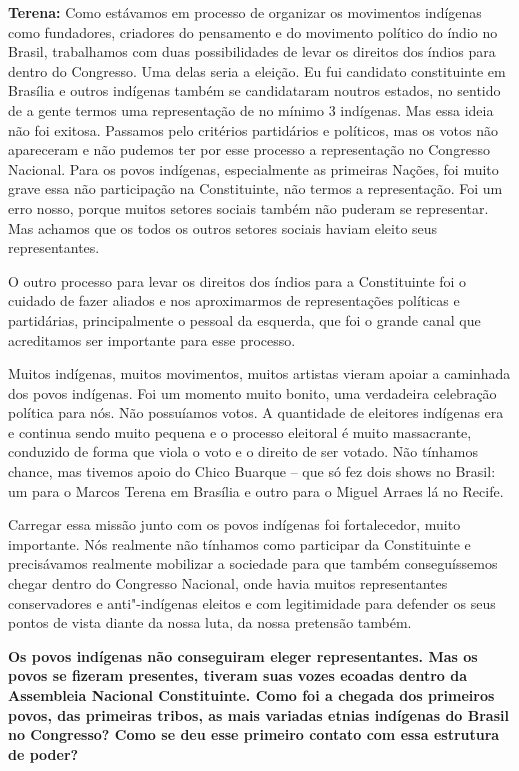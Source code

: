 \textbf{Terena:} Como estávamos em processo de organizar os movimentos
indígenas como fundadores, criadores do pensamento e do movimento
político do índio no Brasil, trabalhamos com duas possibilidades de
levar os direitos dos índios para dentro do Congresso. Uma delas seria a
eleição. Eu fui candidato constituinte em Brasília e outros indígenas
também se candidataram noutros estados, no sentido de a gente termos uma
representação de no mínimo 3 indígenas. Mas essa ideia não foi exitosa.
Passamos pelo critérios partidários e políticos, mas os votos não
apareceram e não pudemos ter por esse processo a representação no
Congresso Nacional. Para os povos indígenas, especialmente as primeiras
Nações, foi muito grave essa não participação na Constituinte, não
termos a representação. Foi um erro nosso, porque muitos setores sociais
também não puderam se representar. Mas achamos que os todos os outros
setores sociais haviam eleito seus representantes.

O outro processo para levar os direitos dos índios para a Constituinte
foi o cuidado de fazer aliados e nos aproximarmos de representações
políticas e partidárias, principalmente o pessoal da esquerda, que foi o
grande canal que acreditamos ser importante para esse processo.

Muitos indígenas, muitos movimentos, muitos artistas vieram apoiar a
caminhada dos povos indígenas. Foi um momento muito bonito, uma
verdadeira celebração política para nós. Não possuíamos votos. A
quantidade de eleitores indígenas era e continua sendo muito pequena e o
processo eleitoral é muito massacrante, conduzido de forma que viola o
voto e o direito de ser votado. Não tínhamos chance, mas tivemos apoio
do Chico Buarque -- que só fez dois shows no Brasil: um para o Marcos
Terena em Brasília e outro para o Miguel Arraes lá no Recife.

Carregar essa missão junto com os povos indígenas foi fortalecedor,
muito importante. Nós realmente não tínhamos como participar da
Constituinte e precisávamos realmente mobilizar a sociedade para que
também conseguíssemos chegar dentro do Congresso Nacional, onde havia
muitos representantes conservadores e anti"-indígenas eleitos e com
legitimidade para defender os seus pontos de vista diante da nossa luta,
da nossa pretensão também.

\textbf{Os povos indígenas não conseguiram eleger representantes. Mas os
povos se fizeram presentes, tiveram suas vozes ecoadas dentro da
Assembleia Nacional Constituinte. Como foi a chegada dos primeiros
povos, das primeiras tribos, as mais variadas etnias indígenas do Brasil
no Congresso? Como se deu esse primeiro contato com essa estrutura de
poder?}


